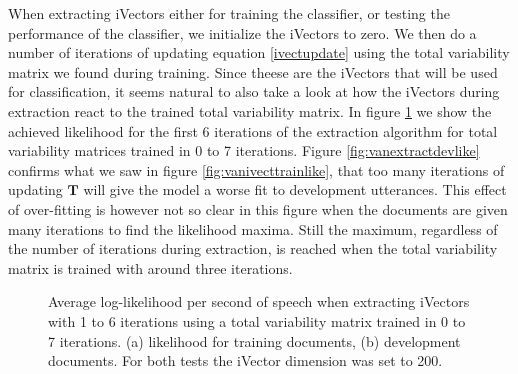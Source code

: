 When extracting iVectors either for training the classifier, or testing the performance of the classifier, we initialize the iVectors to zero. We then do a number of iterations of updating equation \ref{ivectupdate} using the total variability matrix we found during training. Since theese are the iVectors that will be used for classification, it seems natural to also take a look at how the iVectors during extraction react to the trained total variability matrix. In figure \ref{fig:vanextractlike} we show the achieved likelihood for the first 6 iterations of the extraction algorithm for total variability matrices trained in 0 to 7 iterations. Figure \ref{fig:vanextractdevlike} confirms what we saw in figure \ref{fig:vanivecttrainlike}, that too many iterations of updating $\mathbf{T}$ will give the model a worse fit to development utterances. This effect of over-fitting is however not so clear in this figure when the documents are given many iterations to find the likelihood maxima. Still the maximum, regardless of the number of iterations during extraction, is reached when the total variability matrix is trained with around three iterations.

\begin{figure}[hbt!]
	\begin{center}
	\end{center}
	\caption{Average log-likelihood per second of speech when extracting iVectors with 1 to 6 iterations using a total variability matrix trained in 0 to 7 iterations. (a) likelihood for training documents, (b) development documents. For both tests the iVector dimension was set to 200.}
	\label{fig:vanextractlike}
\end{figure}


